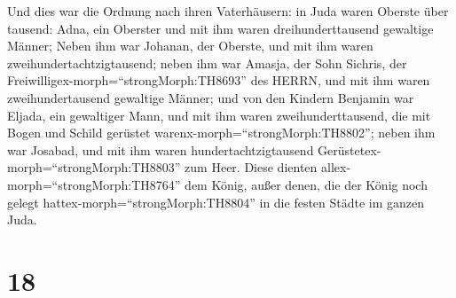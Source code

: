  Und dies war die Ordnung nach ihren Vaterhäusern: in Juda
waren Oberste über tausend: Adna, ein Oberster und mit ihm waren
dreihunderttausend gewaltige Männer;  Neben ihm war
Johanan, der Oberste, und mit ihm waren zweihundertachtzigtausend;
 neben ihm war Amasja, der Sohn Sichris, der
Freiwilligex-morph=``strongMorph:TH8693'' des HERRN, und mit ihm waren
zweihundertausend gewaltige Männer;  und von den Kindern
Benjamin war Eljada, ein gewaltiger Mann, und mit ihm waren
zweihunderttausend, die mit Bogen und Schild gerüstet
warenx-morph=``strongMorph:TH8802'';  neben ihm war
Josabad, und mit ihm waren hundertachtzigtausend
Gerüstetex-morph=``strongMorph:TH8803'' zum Heer.  Diese
dienten allex-morph=``strongMorph:TH8764'' dem König, außer denen, die
der König noch gelegt hattex-morph=``strongMorph:TH8804'' in die festen
Städte im ganzen Juda.

\hypertarget{section-17}{%
\section{18}\label{section-17}}

